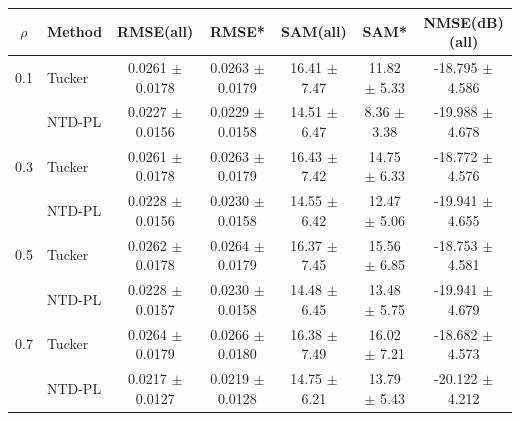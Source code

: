 \begin{tabular}{c l c c c c c}
    \toprule
    $\rho$ & Method & RMSE(all) & RMSE* & SAM(all) & SAM* & NMSE(dB)(all) \\
    \midrule
    0.1 & Tucker & 0.0261 $\pm$ 0.0178 & 0.0263 $\pm$ 0.0179 & 16.41 $\pm$ 7.47 & 11.82 $\pm$ 5.33 & -18.795 $\pm$ 4.586 \\
     & NTD-PL & 0.0227 $\pm$ 0.0156 & 0.0229 $\pm$ 0.0158 & 14.51 $\pm$ 6.47 & 8.36 $\pm$ 3.38 & -19.988 $\pm$ 4.678 \\
    \midrule
    0.3 & Tucker & 0.0261 $\pm$ 0.0178 & 0.0263 $\pm$ 0.0179 & 16.43 $\pm$ 7.42 & 14.75 $\pm$ 6.33 & -18.772 $\pm$ 4.576 \\
     & NTD-PL & 0.0228 $\pm$ 0.0156 & 0.0230 $\pm$ 0.0158 & 14.55 $\pm$ 6.42 & 12.47 $\pm$ 5.06 & -19.941 $\pm$ 4.655 \\
    \midrule
    0.5 & Tucker & 0.0262 $\pm$ 0.0178 & 0.0264 $\pm$ 0.0179 & 16.37 $\pm$ 7.45 & 15.56 $\pm$ 6.85 & -18.753 $\pm$ 4.581 \\
     & NTD-PL & 0.0228 $\pm$ 0.0157 & 0.0230 $\pm$ 0.0158 & 14.48 $\pm$ 6.45 & 13.48 $\pm$ 5.75 & -19.941 $\pm$ 4.679 \\
    \midrule
    0.7 & Tucker & 0.0264 $\pm$ 0.0179 & 0.0266 $\pm$ 0.0180 & 16.38 $\pm$ 7.49 & 16.02 $\pm$ 7.21 & -18.682 $\pm$ 4.573 \\
     & NTD-PL & 0.0217 $\pm$ 0.0127 & 0.0219 $\pm$ 0.0128 & 14.75 $\pm$ 6.21 & 13.79 $\pm$ 5.43 & -20.122 $\pm$ 4.212 \\
    \bottomrule
\end{tabular}
